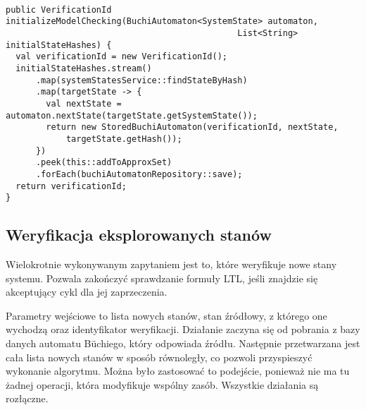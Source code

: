 \begin{minipage}{\linewidth}
\begin{lstlisting}[caption={Kod obsługujący inicjację weryfikacji modelowej.},captionpos=b,label={lst:initializeModelChecking}]

public VerificationId initializeModelChecking(BuchiAutomaton<SystemState> automaton,
                                              List<String> initialStateHashes) {
  val verificationId = new VerificationId();
  initialStateHashes.stream()
      .map(systemStatesService::findStateByHash)
      .map(targetState -> {
        val nextState = automaton.nextState(targetState.getSystemState());
        return new StoredBuchiAutomaton(verificationId, nextState,
            targetState.getHash());
      })
      .peek(this::addToApproxSet)
      .forEach(buchiAutomatonRepository::save);
  return verificationId;
}

\end{lstlisting}
\end{minipage}


\subsection{Weryfikacja eksplorowanych stanów}

Wielokrotnie wykonywanym zapytaniem jest to, które weryfikuje nowe stany systemu.
Pozwala zakończyć sprawdzanie formuły LTL, jeśli znajdzie się akceptujący cykl dla jej zaprzeczenia.

Parametry wejściowe to lista nowych stanów, stan źródłowy, z którego one wychodzą oraz identyfikator weryfikacji.
Działanie zaczyna się od pobrania z bazy danych automatu Büchiego, który odpowiada źródłu.
Następnie przetwarzana jest cała lista nowych stanów w sposób równoległy, co pozwoli przyspieszyć wykonanie algorytmu.
Można było zastosować to podejście, ponieważ nie ma tu żadnej operacji, która modyfikuje wspólny zasób.
Wszystkie działania są rozłączne.


